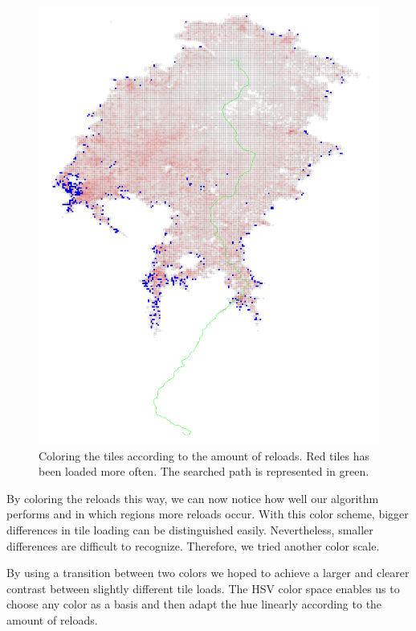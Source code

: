 \documentclass
[
    paper = a4,
    pagesize,
    12 pt,
    oneside,                       %
    open = right,
    DIV = calc,
    BCOR = 0 mm,                   %
    bibtotoc
]
{scrbook}
\begin{document}
\begin{figure}
    \includegraphics[width=\textwidth]{Images/vis-rgb-cache.png}
\caption[]{Coloring the tiles according to the amount of reloads. Red tiles has been loaded more often. The searched path is represented in green.}
\label{fig:reload_coloring_white}
\end{figure}

By coloring the reloads this way, we can now notice how well our algorithm performs and in which regions more reloads occur.
With this color scheme, bigger differences in tile loading can be distinguished easily.
Nevertheless, smaller differences are difficult to recognize.
Therefore, we tried another color scale.

By using a transition between two colors we hoped to achieve a larger and clearer contrast between slightly different tile loads.
The HSV color space enables us to choose any color as a basis and then adapt the hue linearly according to the amount of reloads.
\end{document}
